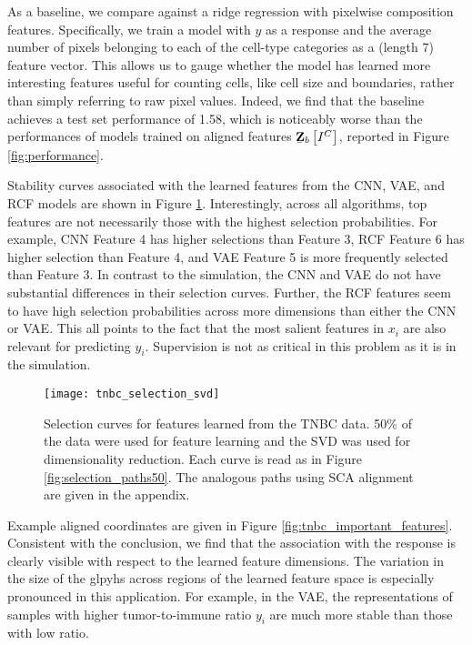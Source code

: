 As a baseline, we compare against a ridge regression with pixelwise composition
features. Specifically, we train a model with $y$ as a response and the average
number of pixels belonging to each of the cell-type categories as a (length 7)
feature vector. This allows us to gauge whether the model has learned more
interesting features useful for counting cells, like cell size and boundaries,
rather than simply referring to raw pixel values. Indeed, we find that the
baseline achieves a test set performance of 1.58, which is noticeably worse than
the performances of models trained on aligned features
$\underaccent{\bar}{\mathbf{Z}}_{b}\left[I^{C}\right]$, reported in Figure
\ref{fig:performance}.

Stability curves associated with the learned features from the CNN, VAE, and RCF
models are shown in Figure \ref{fig:tnbc_selection_svd}. Interestingly, across
all algorithms, top features are not necessarily those with the highest
selection probabilities. For example, CNN Feature 4 has higher selections than
Feature 3, RCF Feature 6 has higher selection than Feature 4, and VAE Feature 5
is more frequently selected than Feature 3. In contrast to the simulation, the
CNN and VAE do not have substantial differences in their selection curves.
Further, the RCF features seem to have high selection probabilities across more
dimensions than either the CNN or VAE. This all points to the fact that the most
salient features in $x_i$ are also relevant for predicting $y_i$. Supervision is
not as critical in this problem as it is in the simulation.

\begin{figure}
  \centering
  \texttt{[image: tnbc\_selection\_svd]}
  \caption{Selection curves for features learned from the TNBC data. 50\% of
    the data were used for feature learning and the SVD was used for
    dimensionality reduction. Each curve is read as in Figure
    \ref{fig:selection_paths50}. The analogous paths using SCA alignment are
    given in the appendix. }
  \label{fig:tnbc_selection_svd}
\end{figure}

Example aligned coordinates are given in Figure
\ref{fig:tnbc_important_features}. Consistent with the conclusion, we find that
the association with the response is clearly visible with respect to the learned
feature dimensions. The variation in the size of the glpyhs across regions of
the learned feature space is especially pronounced in this application. For
example, in the VAE, the representations of samples with higher tumor-to-immune
ratio $y_i$ are much more stable than those with low ratio.

